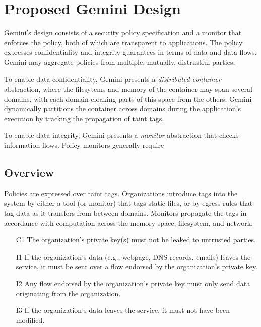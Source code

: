 \section{Proposed Gemini Design}
\label{sec:gemini-design}
%
Gemini's design consists of a security policy specification and a monitor
that enforces the policy, both of which are transparent to applications.
%
The policy expresses confidentiality and integrity guarantees in terms of data
and data flows.
%
Gemini may aggregate policies from multiple, mutually, distrustful parties.


To enable data confidentiality, Gemini presents a \emph{distributed container}
abstraction, where the filesytems and memory of the container may span several
domains, with each domain cloaking parts of this space from the others.
%
Gemini dynamically partitions the container across domains during the
application's execution by tracking the propagation of taint tags.


To enable data integrity, Gemini presents a \emph{monitor} abstraction that
checks information flows.  Policy monitors generally require 



\subsection{Overview}

Policies are expressed over taint tags.
%
Organizations introduce tags into the system by either a tool (or monitor) that
tags static files, or by egress rules that tag data as it transfers from
between domains.
%
Monitors propagate the tags in accordance with computation across the memory
space, filesystem, and network.


\begin{enumerate}
    \item[C1]  The organization's private key(s) must not be leaked to untrusted parties.
\end{enumerate}



\begin{enumerate}
    \item[I1] If the organization's data (e.g., webpage, DNS records, emails) leaves the
        service, it must be sent over a flow endorsed by the organization's private
        key.

    \item[I2] Any flow endorsed by the organization's private key must only send
        data originating from the organization.

    \item[I3] If the organization's data leaves the service, it must not have been
        modified.
\end{enumerate}

